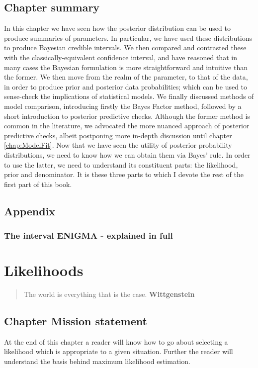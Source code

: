 \documentclass[11pt,fullpage]{book}
\begin{document}
\section{Chapter summary}
In this chapter we have seen how the posterior distribution can be used to produce summaries of parameters. In particular, we have used these distributions to produce Bayesian credible intervals. We then compared and contrasted these with the classically-equivalent confidence interval, and have reasoned that in many cases the Bayesian formulation is more straightforward and intuitive than the former. We then move from the realm of the parameter, to that of the data, in order to produce prior and posterior data probabilities; which can be used to sense-check the implications of statistical models. We finally discussed methods of model comparison, introducing firstly the Bayes Factor method, followed by a short introduction to posterior predictive checks. Although the former method is common in the literature, we advocated the more nuanced approach of posterior predictive checks, albeit postponing more in-depth discussion until chapter \ref{chap:ModelFit}. Now that we have seen the utility of posterior probability distributions, we need to know how we can obtain them via Bayes' rule. In order to use the latter, we need to understand its constituent parts: the likelihood, prior and denominator. It is these three parts to which I devote the rest of the first part of this book.

\section{Appendix}
\subsection{The interval ENIGMA - explained in full}\label{sec:Posterior_appendixConfidenceInterval}


\chapter{Likelihoods}\label{chap:Likelihoods}
\begin{quotation}
The world is everything that is the case. \textbf{Wittgenstein}
\end{quotation}

\section{Chapter Mission statement}
At the end of this chapter a reader will know how to go about selecting a likelihood which is appropriate to a given situation. Further the reader will understand the basis behind maximum likelihood estimation.
\end{document}
